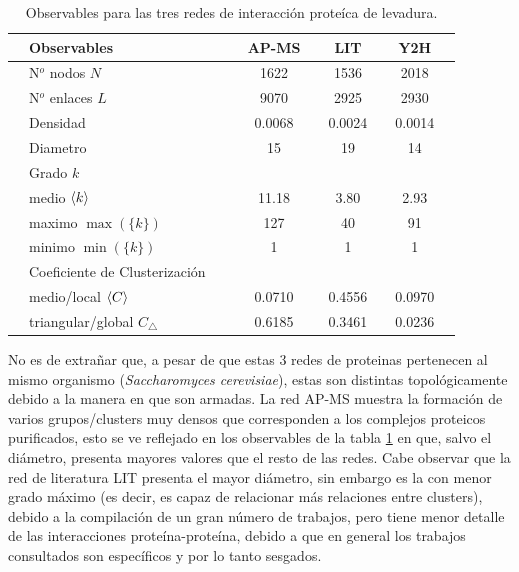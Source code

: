 \begin{table}[!ht]
    \centering
    \caption{\label{tab:obs}Observables para las tres redes de interacci\'on prote\'ica de levadura.}
    {\scriptsize
    \begin{tabularx}{1\columnwidth}{XlX|XcXcXcX}
        \hline\hline
        &Observables        &&& AP-MS && LIT && Y2H &\\ 
        \hline
        &N$^o$ nodos $N$    &&& 1622 && 1536 && 2018 &\\
        &N$^o$ enlaces $L$  &&& 9070 && 2925 && 2930 &\\
        &Densidad           &&& 0.0068 && 0.0024 && 0.0014 &\\
        &Diametro           &&& 15 && 19 && 14 &\\
        \hline
        &Grado $k$&&&\\
        &\quad medio  $\left\langle k\right\rangle$     &&& 11.18 && 3.80 && 2.93 &\\
        &\quad maximo $\max(\{k\})$  &&& 127  && 40   && 91 &\\ 
        &\quad minimo $\min(\{k\})$  &&& 1    && 1    && 1 &\\ 
        \hline
        &Coeficiente de Clusterizaci\'on&&&\\
        &\quad medio/local $\left\langle C\right\rangle$               &&& 0.0710 && 0.4556 && 0.0970 & \\
        &\quad triangular/global $C_\bigtriangleup$ &&& 0.6185 && 0.3461 && 0.0236 & \\
        \hline\hline
    \end{tabularx}
    }
\end{table}
No es de extra\~nar que, a pesar de que estas 3 redes de proteinas 
pertenecen al mismo organismo (\textit{Saccharomyces cerevisiae}),
estas son distintas topol\'ogicamente debido a la manera en que son armadas.
La red AP-MS muestra la formaci\'on de varios grupos/clusters muy densos que corresponden
a los complejos proteicos purificados, esto se ve reflejado en los observables de la tabla \ref{tab:obs}
en que, salvo el di\'ametro, presenta mayores valores que el resto de las redes. 
Cabe observar que la red de literatura LIT presenta el mayor di\'ametro, sin embargo es la con 
menor grado m\'aximo (es decir, es capaz de relacionar m\'as relaciones entre clusters), debido a la compilaci\'on
de un gran n\'umero de trabajos, pero tiene menor detalle de las interacciones prote\'ina-prote\'ina, debido
a que en general los trabajos consultados son espec\'ificos y por lo tanto sesgados.
